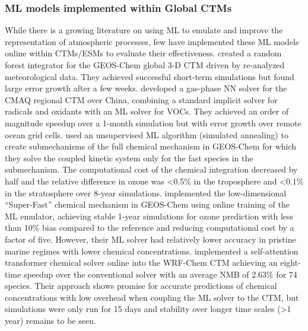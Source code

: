 \documentclass[gmd, manuscript]{copernicus}
\begin{document}
\subsubsection{ML models implemented within Global CTMs}
While there is a growing literature on using ML to emulate and improve the representation of atmospheric processes, few have implemented these ML models online within CTMs/ESMs to evaluate their effectiveness.  created a random forest integrator for the GEOS-Chem global 3-D CTM driven by re-analyzed meteorological data. They achieved successful short-term simulations but found large error growth after a few weeks.  developed a gas-phase NN solver for the CMAQ regional CTM over China, combining a standard implicit solver for radicals and oxidants with an ML solver for VOCs. They achieved an order of magnitude speedup over a 1-month simulation but with error growth over remote ocean grid cells.  used an unsupervised ML algorithm (simulated annealing) to create submechanisms of the full chemical mechanism in GEOS-Chem for which they solve the coupled kinetic system only for the fast species in the submechanism. The computational cost of the chemical integration decreased by half and the relative difference in ozone was <0.5\% in the troposphere and <0.1\% in the stratosphere over 8-year simulations.  implemented the low-dimensional “Super-Fast” chemical mechanism in GEOS-Chem using online training of the ML emulator, achieving stable 1-year simulations for ozone prediction with less than 10\% bias compared to the reference and reducing computational cost by a factor of five. However, their ML solver had relatively lower accuracy in pristine marine regimes with lower chemical concentrations. \citet{xia_advancing_2024} implemented a self-attention transformer chemical solver online into the WRF-Chem CTM achieving an eight-time speedup over the conventional solver with an average NMB of 2.63\% for 74 species. Their approach shows promise for accurate predictions of chemical concentrations with low overhead when coupling the ML solver to the CTM, but simulations were only run for 15 days and stability over longer time scales (>1 year) remains to be seen. 
\end{document}
